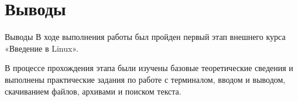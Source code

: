 \documentclass[
  11pt,
  ignorenonframetext,
  aspectratio=169,
  russian,
]{beamer}
\begin{document}
\section{Выводы}\label{ux432ux44bux432ux43eux434ux44b}

\begin{frame}{Выводы}
В ходе выполнения работы был пройден первый этап внешнего курса
«Введение в Linux».

В процессе прохождения этапа были изучены базовые теоретические сведения
и выполнены практические задания по работе с терминалом, вводом и
выводом, скачиванием файлов, архивами и поиском текста.
\end{frame}
\end{document}
